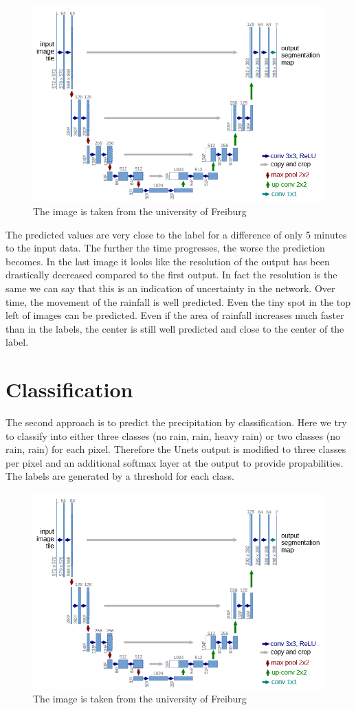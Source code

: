 \documentclass[oneside]{htwg-report}
\begin{document}
\begin{figure}[ht]
    \centering
    \includegraphics[width=0.8\linewidth]{../pics/UNet_Biomedical}
    \caption{The image is taken from the university of Freiburg~\cite{ronneberger2015u}}
\end{figure}

The predicted values are very close to the label for a difference of only 5 minutes to the input data. The further the time progresses, the worse the prediction becomes.
In the last image it looks like the resolution of the output has been drastically decreased compared to the first output. 
In fact the resolution is the same we can say that this is an indication of uncertainty in the network.
Over time, the movement of the rainfall is well predicted. Even the tiny spot in the top left of images can be predicted.
Even if the area of rainfall increases much faster than in the labels, the center is still well predicted and close to the center of the label.

\section*{Classification}
The second approach is to predict the precipitation by classification. Here we try to classify into either three classes (no rain, rain, heavy rain) or two classes (no rain, rain) for each pixel.
Therefore the Unets output is modified to three classes per pixel and an additional softmax layer at the output to provide propabilities. The labels are generated by a threshold for each class.

\begin{figure}[ht]
    \centering
    \includegraphics[width=0.8\linewidth]{../pics/UNet_Biomedical}
    \caption{The image is taken from the university of Freiburg~\cite{ronneberger2015u}}
\end{figure}
\end{document}
